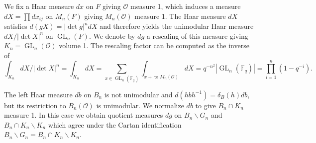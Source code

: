 \documentclass{amsart}
\theoremstyle{definition}
\newcommand{\GL}{\operatorname{GL}}
\begin{document}
{We fix a Haar measure $dx$ on $F$ giving $\mathcal{O}$ measure
1, which induces a measure $dX=\prod dx_{ij}$ on $M_n(F)$ giving
$M_n(\mathcal{O})$ measure 1. The Haar measure $dX$ satisfies $d(gX)=|\det g|^n dX$ and therefore yields the unimodular
Haar measure $dX/|\det X|^n$ on $\GL_n(F)$. We denote by
$dg$ a rescaling of this measure giving $K_n=\GL_n(\mathcal{O})$ volume 1. The
rescaling factor can be computed as the inverse of
\[\int_{K_n} dX/|\det X|^n=\int_{K_n} dX = \sum_{x\in \GL_n(\mathbb{F}_q)}\int_{x+\varpi M_n(\mathcal{O})}dX = q^{-n^2}\left|\GL_n(\mathbb{F}_q)\right|=\prod_{i=1}^{n}(1-q^{-i}).\]

The left Haar measure $db$ on $B_n$ is not unimodular and $d(hbh^{-1}) = \delta_B(h)db$, but its restriction to $B_n(\mathcal{O})$ is unimodular. We normalize $db$ to give $B_n\cap K_n$ measure 1. In this case we obtain quotient measures $dg$ on $B_n\backslash G_n$ and $B_n\cap K_n\backslash K_n$ which agree under the Cartan identification $B_n\backslash G_n=B_n\cap K_n\backslash K_n$.



}
\end{document}
